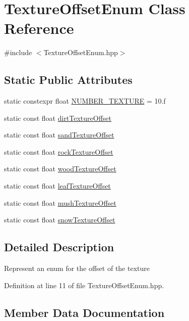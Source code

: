 \hypertarget{class_texture_offset_enum}{}\section{Texture\+Offset\+Enum Class Reference}
\label{class_texture_offset_enum}


{\ttfamily \#include $<$Texture\+Offset\+Enum.\+hpp$>$}

\subsection*{Static Public Attributes}
\begin{DoxyCompactItemize}
\item 
static constexpr float \hyperlink{class_texture_offset_enum_a6f6e1758262760f88207539473661239}{N\+U\+M\+B\+E\+R\+\_\+\+T\+E\+X\+T\+U\+RE} = 10.f
\item 
static const float \hyperlink{class_texture_offset_enum_a0b39b1c6d118bcb0b4d14144f521f0a6}{dirt\+Texture\+Offset}
\item 
static const float \hyperlink{class_texture_offset_enum_a9c04b5f8d20e48f0a37f9a73186c6b49}{sand\+Texture\+Offset}
\item 
static const float \hyperlink{class_texture_offset_enum_a88fbf93cd4e48f883370ad7d335f0df3}{rock\+Texture\+Offset}
\item 
static const float \hyperlink{class_texture_offset_enum_aa2e307d0364345fc9dab4e3e77f5514c}{wood\+Texture\+Offset}
\item 
static const float \hyperlink{class_texture_offset_enum_a0c28990a9c8da37c5c22c751106309cd}{leaf\+Texture\+Offset}
\item 
static const float \hyperlink{class_texture_offset_enum_ab0b0a5dc030406f54d383ab3e49cdcaa}{mush\+Texture\+Offset}
\item 
static const float \hyperlink{class_texture_offset_enum_ab6edc9d913eb2e2e07417be2903ef35d}{snow\+Texture\+Offset}
\end{DoxyCompactItemize}


\subsection{Detailed Description}
Represent an enum for the offset of the texture 

Definition at line 11 of file Texture\+Offset\+Enum.\+hpp.



\subsection{Member Data Documentation}
\mbox{\label{class_texture_offset_enum_a0b39b1c6d118bcb0b4d14144f521f0a6}} 
